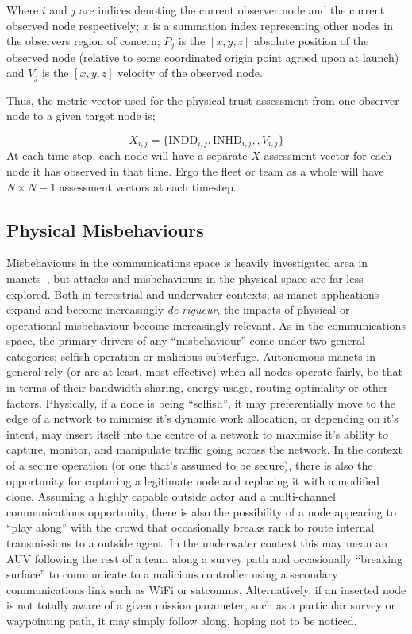 Where $i$ and $j$ are indices denoting the current observer node and the current observed node respectively; $x$ is a summation index representing other nodes in the observers region of concern; $P_{j}$ is the $[x,y,z]$ absolute position of the observed node (relative to some coordinated origin point agreed upon at launch) and $V_{j}$ is the $[x,y,z]$ velocity of the observed node.

Thus, the metric vector used for the physical-trust assessment from one observer node to a given target node is;

\begin{equation}
  X_{i,j}=\{\text{INDD}_{i,j}, \text{INHD}_{i,j},, V_{i,j}\}
  \label{eq:phys_vector}
\end{equation}
At each time-step, each node will have a separate $X$ assessment vector for each node it has observed in that time. 
Ergo the fleet or team as a whole will have $N\times N-1$ assessment vectors at each timestep.

\subsection{Physical Misbehaviours}

Misbehaviours in the communications space is heavily investigated area in \glspl{manet}~\cite{Konate2011,Wang2009,Chen2014a,Mitchell2014}, but attacks and misbehaviours in the physical space are far less explored. 
Both in terrestrial and underwater contexts, as \gls{manet} applications expand and become increasingly \emph{de rigueur}, the impacts of physical or operational misbehaviour become increasingly relevant. 
As in the communications space, the primary drivers of any ``misbehaviour'' come under two general categories; selfish operation or malicious subterfuge.
Autonomous \glspl{manet} in general rely (or are at least, most effective) when all nodes operate fairly, be that in terms of their bandwidth sharing, energy usage, routing optimality or other factors. 
Physically, if a node is being ``selfish'', it may preferentially move to the edge of a network to minimise it's dynamic work allocation, or depending on it's intent, may insert itself into the centre of a network to maximise it's ability to capture, monitor, and manipulate traffic going across the network. 
In the context of a secure operation (or one that's assumed to be secure), there is also the opportunity for capturing a legitimate node and replacing it with a modified clone.
Assuming a highly capable outside actor and a multi-channel communications opportunity, there is also the possibility of a node appearing to ``play along'' with the crowd that occasionally breaks rank to route internal transmissions to a outside agent.
In the underwater context this may mean an AUV following the rest of a team along a survey path and occasionally ``breaking surface'' to communicate to a malicious controller using a secondary communications link such as WiFi or satcomms.
Alternatively, if an inserted node is not totally aware of a given mission parameter, such as a particular survey or waypointing path, it may simply follow along, hoping not to be noticed.

